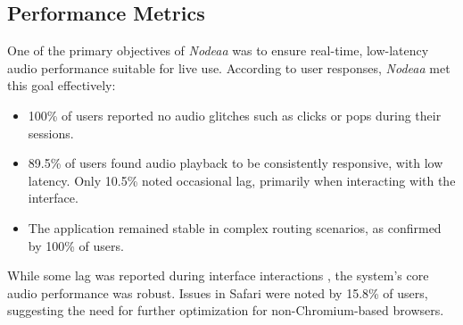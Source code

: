 \documentclass[10pt,twocolumn]{article}
\begin{document}
\subsection{Performance Metrics}
One of the primary objectives of \textit{Nodeaa} was to ensure real-time, low-latency audio performance suitable for live use. According to user responses, \textit{Nodeaa} met this goal effectively:
\begin{itemize}
    \item 100\% of users reported no audio glitches such as clicks or pops during their sessions.
    \item 89.5\% of users found audio playback to be consistently responsive, with low latency. Only 10.5\% noted occasional lag, primarily when interacting with the interface.
    \item The application remained stable in complex routing scenarios, as confirmed by 100\% of users.
\end{itemize}
While some lag was reported during interface interactions \cite{chkec2019performance}, the system’s core audio performance was robust. Issues in Safari were noted by 15.8\% of users, suggesting the need for further optimization for non-Chromium-based browsers.
\end{document}
